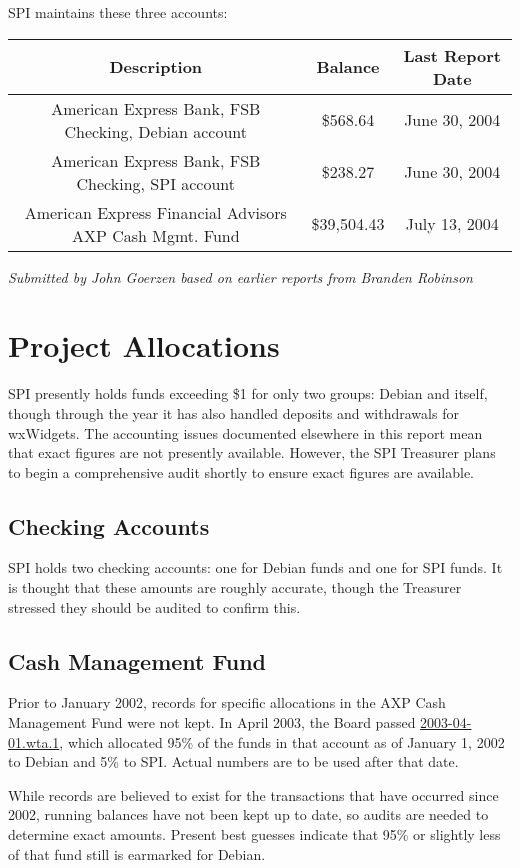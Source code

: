 \documentclass[letterpaper]{report}
\begin{document}
SPI maintains these three accounts:

\begin{tabular}{|c|c|c|}
\hline
Description & Balance & Last Report Date\tabularnewline
\hline
\hline
American Express Bank, FSB Checking, Debian account & \$568.64 & June 30, 2004\tabularnewline
\hline
American Express Bank, FSB Checking, SPI account & \$238.27 & June 30, 2004\tabularnewline
\hline
American Express Financial Advisors AXP Cash Mgmt. Fund & \$39,504.43 & July 13, 2004\tabularnewline
\hline
\end{tabular}

\emph{Submitted by John Goerzen based on earlier reports from Branden Robinson}


\section{Project Allocations}

SPI presently holds funds exceeding \$1 for only two groups: Debian
and itself, though through the year it has also handled deposits and
withdrawals for wxWidgets. The accounting issues documented elsewhere
in this report mean that exact figures are not presently available.
However, the SPI Treasurer plans to begin a comprehensive audit shortly
to ensure exact figures are available.


\subsection{Checking Accounts}

SPI holds two checking accounts: one for Debian funds and one for
SPI funds. It is thought that these amounts are roughly accurate,
though the Treasurer stressed they should be audited to confirm this.


\subsection{Cash Management Fund}

Prior to January 2002, records for specific allocations in the AXP
Cash Management Fund were not kept. In April 2003, the Board passed
\href{http://www.spi-inc.org/corporate/resolutions/2003/2003-04-01.wta.1}{2003-04-01.wta.1},
which allocated 95\% of the funds in that account as of January 1,
2002 to Debian and 5\% to SPI. Actual numbers are to be used after
that date.

While records are believed to exist for the transactions that have
occurred since 2002, running balances have not been kept up to date,
so audits are needed to determine exact amounts. Present best guesses
indicate that 95\% or slightly less of that fund still is earmarked
for Debian.
\end{document}
